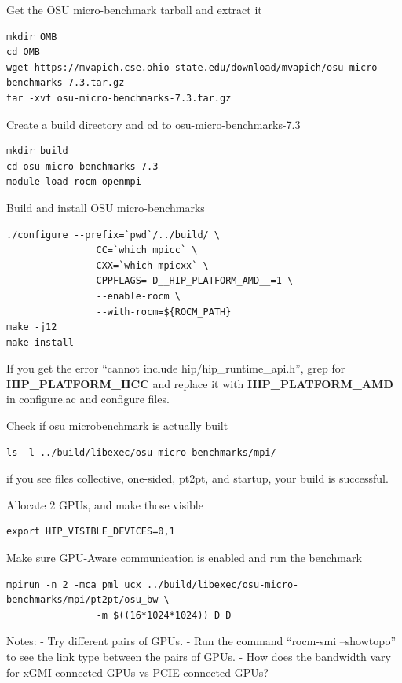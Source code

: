 \documentclass[
]{article}
\begin{document}
Get the OSU micro-benchmark tarball and extract it

\begin{verbatim}
mkdir OMB
cd OMB
wget https://mvapich.cse.ohio-state.edu/download/mvapich/osu-micro-benchmarks-7.3.tar.gz
tar -xvf osu-micro-benchmarks-7.3.tar.gz
\end{verbatim}

Create a build directory and cd to osu-micro-benchmarks-7.3

\begin{verbatim}
mkdir build
cd osu-micro-benchmarks-7.3
module load rocm openmpi
\end{verbatim}

Build and install OSU micro-benchmarks

\begin{verbatim}
./configure --prefix=`pwd`/../build/ \
                CC=`which mpicc` \
                CXX=`which mpicxx` \
                CPPFLAGS=-D__HIP_PLATFORM_AMD__=1 \
                --enable-rocm \
                --with-rocm=${ROCM_PATH}
make -j12
make install
\end{verbatim}

If you get the error ``cannot include hip/hip\_runtime\_api.h'', grep
for \textbf{HIP\_PLATFORM\_HCC} and replace it with
\textbf{HIP\_PLATFORM\_AMD} in configure.ac and configure files.

Check if osu microbenchmark is actually built

\begin{verbatim}
ls -l ../build/libexec/osu-micro-benchmarks/mpi/
\end{verbatim}

if you see files collective, one-sided, pt2pt, and startup, your build
is successful.

Allocate 2 GPUs, and make those visible

\begin{verbatim}
export HIP_VISIBLE_DEVICES=0,1
\end{verbatim}

Make sure GPU-Aware communication is enabled and run the benchmark

\begin{verbatim}
mpirun -n 2 -mca pml ucx ../build/libexec/osu-micro-benchmarks/mpi/pt2pt/osu_bw \
                -m $((16*1024*1024)) D D
\end{verbatim}

Notes: - Try different pairs of GPUs. - Run the command ``rocm-smi
--showtopo'' to see the link type between the pairs of GPUs. - How does
the bandwidth vary for xGMI connected GPUs vs PCIE connected GPUs?
\end{document}
